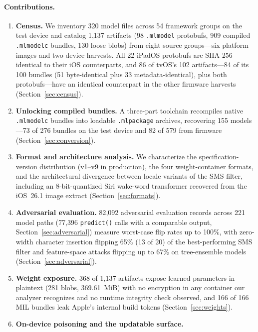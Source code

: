 \documentclass[letterpaper,twocolumn,10pt]{article}
\newcommand{\mlmodel}{\texttt{.mlmodel}\xspace}
\newcommand{\mlmodelc}{\texttt{.mlmodelc}\xspace}
\newcommand{\mlpackage}{\texttt{.mlpackage}\xspace}
\begin{document}
\paragraph{Contributions.}
\begin{enumerate}
    \item \textbf{Census.}
    We inventory 320 model files across 54 framework groups on the test
    device and catalog 1{,}137 artifacts (98 \mlmodel{} protobufs,
    909 compiled \mlmodelc{} bundles, 130 loose blobs) from eight source
    groups---six platform images and two device harvests.
    All 22 iPadOS protobufs are SHA-256-identical to their iOS counterparts,
    and 86 of tvOS's 102 artifacts---84 of its 100 bundles (51 byte-identical
    plus 33 metadata-identical), plus both protobufs---have an identical
    counterpart in the other firmware harvests (Section~\ref{sec:census}).
    \item \textbf{Unlocking compiled bundles.}
    A three-part toolchain recompiles native \mlmodelc{} bundles into
    loadable \mlpackage{} archives, recovering 155 models---73 of 276 bundles
    on the test device and 82 of 579 from firmware
    (Section~\ref{sec:conversion}).
    \item \textbf{Format and architecture analysis.}
    We characterize the specification-version distribution (v1--v9 in
    production), the four weight-container formats, and the architectural
    divergence between locale variants of the SMS filter, including an
    8-bit-quantized Siri wake-word transformer recovered from the iOS~26.1
    image extract (Section~\ref{sec:formats}).
    \item \textbf{Adversarial evaluation.}
    82{,}092 adversarial evaluation records across 221 model paths
    (77{,}396 \texttt{predict()} calls with a comparable output,
    Section~\ref{sec:adversarial})
    measure worst-case flip rates up to 100\%, with zero-width character
    insertion flipping 65\% (13 of 20) of the best-performing SMS filter
    and feature-space attacks flipping up to 67\% on tree-ensemble models
    (Section~\ref{sec:adversarial}).
    \item \textbf{Weight exposure.}
    368 of 1{,}137 artifacts expose learned parameters in plaintext
    (281 blobs, 369.61~MiB) with no encryption in any container our analyzer
    recognizes and no runtime integrity check observed, and 166 of 166 MIL
    bundles leak Apple's internal build tokens (Section~\ref{sec:weights}).
    \item \textbf{On-device poisoning and the updatable surface.}

\end{enumerate}
\end{document}
